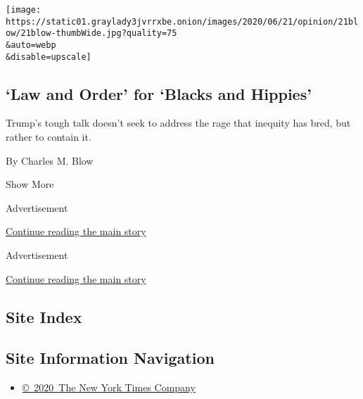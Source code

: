 \begin{enumerate}
  \texttt{[image: https://static01.graylady3jvrrxbe.onion/images/2020/06/21/opinion/21blow/21blow-thumbWide.jpg?quality=75\\\&auto=webp\\\&disable=upscale]}

  \hypertarget{law-and-order-for-blacks-and-hippies}{%
  \subsection{`Law and Order' for `Blacks and
  Hippies'}\label{law-and-order-for-blacks-and-hippies}}

  Trump's tough talk doesn't seek to address the rage that inequity has
  bred, but rather to contain it.

  By Charles M. Blow
\end{enumerate}

Show More

Advertisement

\protect\hyperlink{after-mid1}{Continue reading the main story}

Advertisement

\protect\hyperlink{after-mktg}{Continue reading the main story}

\hypertarget{site-index}{%
\subsection{Site Index}\label{site-index}}

\hypertarget{site-information-navigation}{%
\subsection{Site Information
Navigation}\label{site-information-navigation}}

\begin{itemize}
\tightlist
\item
  \href{https://help.nytimes3xbfgragh.onion/hc/en-us/articles/115014792127-Copyright-notice}{©~2020~The
  New York Times Company}
\end{itemize}

